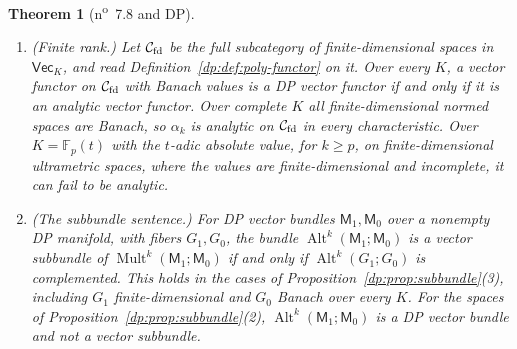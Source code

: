 \documentclass[11pt]{amsart}
\newtheorem{theorem}{Theorem}[section]
\theoremstyle{definition}
\theoremstyle{remark}
\numberwithin{equation}{section}
\newcommand{\F}{\mathbb F}
\newcommand{\cL}{\mathcal L}
\newcommand{\Alt}{\operatorname{Alt}}
\newcommand{\Mult}{\operatorname{Mult}}
\newcommand{\cC}{\mathcal{C}}
\theoremstyle{plain}
\theoremstyle{definition}
\theoremstyle{plain}
\begin{document}
\begin{theorem}[n\textsuperscript{o}~7.8 and DP]
\begin{enumerate}
\begin{enumerate}
\item If $\operatorname{char}K=p$, $K$ is not spherically complete and $k\ge p$, then $\alpha_k$ is DP and not analytic on $\cC_{\rm um}$. If $\operatorname{char}K=0$, every $\alpha_k$ is analytic.
\item If $\operatorname{char}K=p$, $K$ is densely valued and spherically complete and $k\ge p$, we do not decide whether $\alpha_k$ is analytic on $\cC_{\rm um}$ (\cite[Section~12]{I}; see also Question~\ref{dp:q:residual}). Every vector functor on $\cC_{\rm um}$ whose values have equivalent ultrametric spherically complete norms is DP if and only if it is analytic. For ultrametric Banach spaces $E,D,F,F'$ with $E$ or $D$ of countable type, the hom map of $\alpha_k$ on $\cL(F,F')\times\cL(E,D)$ is the diagonal of a bounded $(k+1)$\nobreakdash-linear map, so it is analytic, in every degree~\cite[Corollary~10.5]{I}.
\end{enumerate}
\item \textup{(Finite rank.)} Let $\cC_{\rm fd}$ be the full subcategory of finite-dimensional spaces in $\mathsf{Vec}_K$, and read Definition~\ref{dp:def:poly-functor} on it. Over every $K$, a vector functor on $\cC_{\rm fd}$ with Banach values is a DP vector functor if and only if it is an analytic vector functor. Over complete $K$ all finite-dimensional normed spaces are Banach, so $\alpha_k$ is analytic on $\cC_{\rm fd}$ in every characteristic. Over $K=\F_p(t)$ with the $t$-adic absolute value, for $k\ge p$, on finite-dimensional ultrametric spaces, where the values are finite-dimensional and incomplete, it can fail to be analytic.
\item \textup{(The subbundle sentence.)} For DP vector bundles $\mathsf M_1,\mathsf M_0$ over a nonempty DP manifold, with fibers $G_1,G_0$, the bundle $\Alt^k(\mathsf M_1;\mathsf M_0)$ is a vector subbundle of $\Mult^k(\mathsf M_1;\mathsf M_0)$ if and only if $\Alt^k(G_1;G_0)$ is complemented. This holds in the cases of Proposition~\ref{dp:prop:subbundle}\textup{(3)}, including $G_1$ finite-dimensional and $G_0$ Banach over every $K$. For the spaces of Proposition~\ref{dp:prop:subbundle}\textup{(2)}, $\Alt^k(\mathsf M_1;\mathsf M_0)$ is a DP vector bundle and not a vector subbundle.
\end{enumerate}
\end{theorem}
\end{document}
